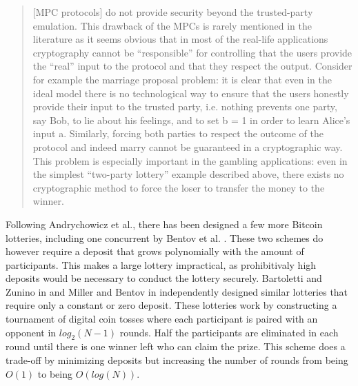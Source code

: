 \begin{quotation}
  [MPC protocols] do not provide security
  beyond the trusted-party emulation. This drawback of the
  MPCs is rarely mentioned in the literature as it seems obvious
  that in most of the real-life applications cryptography cannot
  be “responsible” for controlling that the users provide the
  “real” input to the protocol and that they respect the output.
  Consider for example the marriage proposal problem: it is clear
  that even in the ideal model there is no technological way
  to ensure that the users honestly provide their input to the
  trusted party, i.e. nothing prevents one party, say Bob, to lie
  about his feelings, and to set b = 1 in order to learn Alice’s
  input a. Similarly, forcing both parties to respect the outcome
  of the protocol and indeed marry cannot be guaranteed in a
  cryptographic way. This problem is especially important in the
  gambling applications: even in the simplest “two-party lottery”
  example described above, there exists no cryptographic method
  to force the loser to transfer the money to the winner.
\end{quotation}

Following Andrychowicz et al., there has been designed a few more Bitcoin lotteries, including one concurrent by Bentov et al. \cite{bentov_how_2014}. These two schemes do however require a deposit that grows polynomially with the amount of participants. This makes a large lottery impractical, as prohibitivaly high deposits would be necessary to conduct the lottery securely. Bartoletti and Zunino in \cite{bartoletti_constant-deposit_2017} and Miller and Bentov in \cite{miller_zero-collateral_2017} independently designed similar lotteries that require only a constant or zero deposit. These lotteries work by constructing a tournament of digital coin tosses where each participant is paired with an opponent in $log_2(N-1)$ rounds. Half the participants are eliminated in each round until there is one winner left who can claim the prize. This scheme does a trade-off by minimizing deposits but increasing the number of rounds from being $O(1)$ to being $O(log(N))$. 
